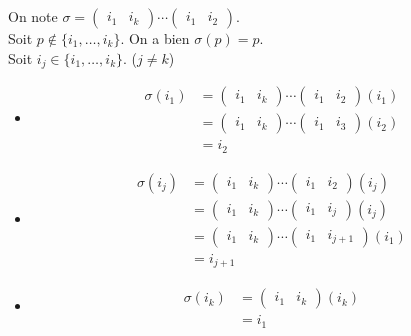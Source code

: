 \documentclass[../main.tex]{subfiles}
\begin{document}
\noindent On note $\sigma = \begin{pmatrix}
    i_1 & i_k
\end{pmatrix} \cdots \begin{pmatrix}
    i_1 & i_2
\end{pmatrix}$. \\
Soit $p\not\in \{ i_1, \ldots, i_k \}$. On a bien $\sigma(p) = p$. \\
Soit $i_j\in \{ i_1, \ldots, i_k \}$. ($j\neq k$) \\
\begin{itemize}
    \item \begin{align*}
        \sigma(i_1) &= \begin{pmatrix}
            i_1 & i_k
        \end{pmatrix} \cdots \begin{pmatrix}
            i_1 & i_2
        \end{pmatrix}(i_1) \\
        &= \begin{pmatrix}
            i_1 & i_k
        \end{pmatrix} \cdots \begin{pmatrix}
            i_1 & i_3
        \end{pmatrix}(i_2) \\
        &= i_2
    \end{align*}

    \item \begin{align*}
        \sigma(i_j) &= \begin{pmatrix}
            i_1 & i_k
        \end{pmatrix} \cdots \begin{pmatrix}
            i_1 & i_2
        \end{pmatrix}(i_j) \\
        &= \begin{pmatrix}
            i_1 & i_k
        \end{pmatrix} \cdots \begin{pmatrix}
            i_1 & i_{j}
        \end{pmatrix}(i_j) \\
        &= \begin{pmatrix}
            i_1 & i_k
        \end{pmatrix} \cdots \begin{pmatrix}
            i_1 & i_{j+1}
        \end{pmatrix}(i_1) \\
        &= i_{j+1}
    \end{align*}
    
    \item \begin{align*}
        \sigma(i_k) &= \begin{pmatrix}
            i_1 & i_k
        \end{pmatrix} (i_k) \\
        &= i_1
    \end{align*}
\end{itemize}
\end{document}
